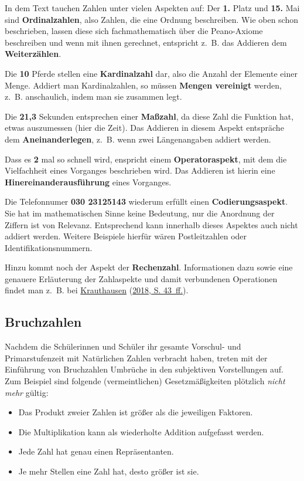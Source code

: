 \documentclass[
  ngerman,
]{scrbook}
\providecommand{\tightlist}{%
  \setlength{\itemsep}{0pt}\setlength{\parskip}{0pt}}
\theoremstyle{definition}
\theoremstyle{definition}
\theoremstyle{definition}
\theoremstyle{definition}
\theoremstyle{remark}
\begin{document}
In dem Text tauchen Zahlen unter vielen Aspekten auf: Der \textbf{1.} Platz und \textbf{15.} Mai sind \textbf{Ordinalzahlen}, also Zahlen, die eine Ordnung beschreiben. Wie oben schon beschrieben, lassen diese sich fachmathematisch über die Peano-Axiome beschreiben und wenn mit ihnen gerechnet, entspricht z.~B. das Addieren dem \textbf{Weiterzählen}.

Die \textbf{10} Pferde stellen eine \textbf{Kardinalzahl} dar, also die Anzahl der Elemente einer Menge. Addiert man Kardinalzahlen, so müssen \textbf{Mengen vereinigt} werden, z.~B. anschaulich, indem man sie zusammen legt.

Die \textbf{21,3} Sekunden entsprechen einer \textbf{Maßzahl}, da diese Zahl die Funktion hat, etwas auszumessen (hier die Zeit). Das Addieren in diesem Aspekt entspräche dem \textbf{Aneinanderlegen}, z.~B. wenn zwei Längenangaben addiert werden.

Dass es \textbf{2} mal so schnell wird, enspricht einem \textbf{Operatoraspekt}, mit dem die Vielfachheit eines Vorganges beschrieben wird. Das Addieren ist hierin eine \textbf{Hinereinanderausführung} eines Vorganges.

Die Telefonnumer \textbf{030 23125143} wiederum erfüllt einen \textbf{Codierungsaspekt}. Sie hat im mathematischen Sinne keine Bedeutung, nur die Anordnung der Ziffern ist von Relevanz. Entsprechend kann innerhalb dieses Aspektes auch nicht addiert werden. Weitere Beispiele hierfür wären Postleitzahlen oder Identifikationsnummern.

Hinzu kommt noch der Aspekt der \textbf{Rechenzahl}. Informationen dazu sowie eine genauere Erläuterung der Zahlaspekte und damit verbundenen Operationen findet man z.~B. bei \protect\hyperlink{ref-Krauthausen:2018}{Krauthausen} (\protect\hyperlink{ref-Krauthausen:2018}{2018, S. 43~ff.}).

\hypertarget{bruchzahlen}{%
\subsection{Bruchzahlen}\label{bruchzahlen}}

Nachdem die Schülerinnen und Schüler ihr gesamte Vorschul- und Primarstufenzeit mit Natürlichen Zahlen verbracht haben, treten mit der Einführung von Bruchzahlen Umbrüche in den subjektiven Vorstellungen auf. Zum Beispiel sind folgende (vermeintlichen) Gesetzmäßigkeiten plötzlich \emph{nicht mehr} gültig:

\begin{itemize}
\tightlist
\item
  Das Produkt zweier Zahlen ist größer als die jeweiligen Faktoren.
\item
  Die Multiplikation kann als wiederholte Addition aufgefasst werden.
\item
  Jede Zahl hat genau einen Repräsentanten.
\item
  Je mehr Stellen eine Zahl hat, desto größer ist sie.
\end{itemize}
\end{document}
